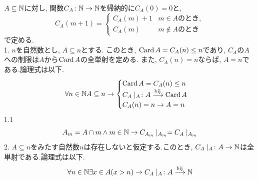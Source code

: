 \begin{proposition}[p185の命題7.1.5]
	$A \subseteq \mathbb{N}$に対し,
	関数$C_A\colon \mathbb{N} \to \mathbb{N}$を帰納的に$C_A(0)=0$と,
  \begin{equation*}
    C_A(m + 1)=
    \begin{cases}
      C_A(m) + 1 & m \in A\text{のとき},\\
      C_A(m)  & m \not\in A \text{のとき}
    \end{cases}
  \end{equation*}
  で定める.\\
  1. $n$を自然数とし,
  $A \subseteq n$とする.
  このとき,
  $\operatorname{Card}A=C_A(n) \leq n$であり,
  $C_A$の$A$への制限は$A$から$\operatorname{Card}A$の全単射を定める.
  また,
  $C_A(n)=n$ならば,
  $A=n$である.論理式は以下.
  \begin{equation*}
    \forall n \in \mathbb{N} A \subseteq n \rightarrow
    \begin{cases}
     \operatorname{Card}A=C_A(n) \leq n\\
     C_A\mid_{A}\colon A \xrightarrow{\text{bij}} \operatorname{Card}A\\
     C_A(n) = n \rightarrow A=n\\
    \end{cases}
  \end{equation*}
 1.1\\
 \begin{equation*}
   A_m = A \cap m \land m \in \mathbb{N} \rightarrow C_{A_m}\mid_{A_m} = C_A\mid_{A_m}
 \end{equation*}
 2. $A \subseteq n$をみたす自然数$n$は存在しないと仮定する.このとき,
 $C_A\mid_{A}\colon A \to \mathbb{N}$は全単射である.論理式は以下.
 \begin{equation*}
 \forall n \in \mathbb{N} \exists x \in A(x > n) \rightarrow C_A\mid_{A}\colon A \xrightarrow{\text{bij}} \mathbb{N}
 \end{equation*}
\end{proposition}
